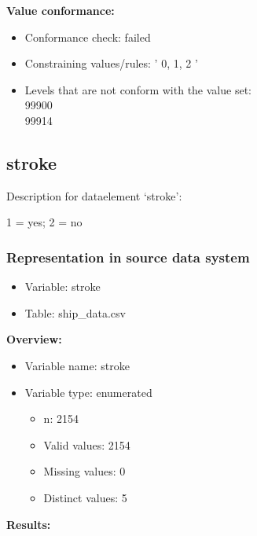 \documentclass[
]{article}
\providecommand{\tightlist}{%
  \setlength{\itemsep}{0pt}\setlength{\parskip}{0pt}}
\begin{document}
\textbf{Value conformance:}

\begin{itemize}
\tightlist
\item
  Conformance check: failed
\item
  Constraining values/rules: ' 0, 1, 2 '
\item
  Levels that are not conform with the value set:\\
  99900\\
  99914
\end{itemize}

\newpage

\hypertarget{stroke}{%
\subsection{stroke}\label{stroke}}

Description for dataelement `stroke':

1 = yes; 2 = no

\hypertarget{representation-in-source-data-system-26}{%
\subsubsection{\texorpdfstring{Representation in \textbf{source} data
system}{Representation in source data system}}\label{representation-in-source-data-system-26}}

\begin{itemize}
\tightlist
\item
  Variable: stroke
\item
  Table: ship\_data.csv
\end{itemize}

\textbf{Overview:}

\begin{itemize}
\tightlist
\item
  Variable name: stroke
\item
  Variable type: enumerated

  \begin{itemize}
  \tightlist
  \item
    n: 2154
  \item
    Valid values: 2154
  \item
    Missing values: 0
  \item
    Distinct values: 5
  \end{itemize}
\end{itemize}

\textbf{Results:}\\
\end{document}
